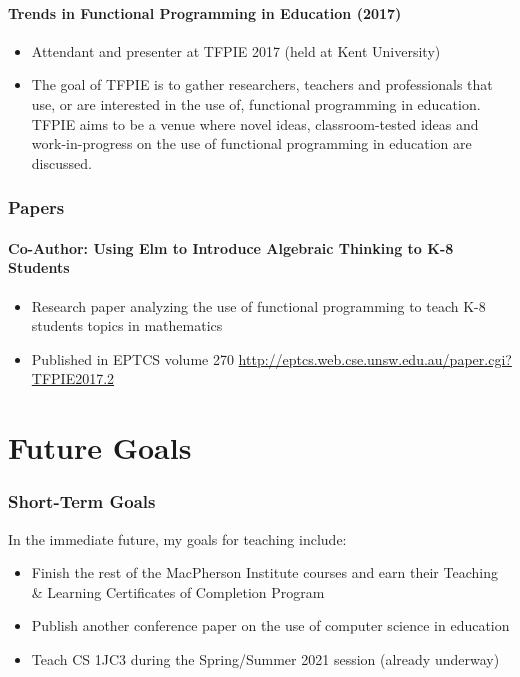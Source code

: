 \documentclass[12pt]{report}
\begin{document}
\subsection{Trends in Functional Programming in Education (2017)}
\label{sec:orgec62704}
\begin{itemize}
\item Attendant and presenter at TFPIE 2017 (held at Kent University)
\item The goal of TFPIE is to gather researchers, teachers and professionals
that use, or are interested in the use of, functional programming in
education. TFPIE aims to be a venue where novel ideas, classroom-tested
ideas and work-in-progress on the use of functional programming in
education are discussed.
\end{itemize}

\section{Papers}
\label{sec:org1e632c1}
\subsection{Co-Author: Using Elm to Introduce Algebraic Thinking to K-8 Students}
\label{sec:org4a5f0c2}
\begin{itemize}
\item Research paper analyzing the use of functional programming to teach K-8
students topics in mathematics
\item Published in EPTCS volume 270 \url{http://eptcs.web.cse.unsw.edu.au/paper.cgi?TFPIE2017.2}
\end{itemize}

\part{Future Goals}
\label{sec:orgf3057ca}
\section{Short-Term Goals}
\label{sec:orga6f4624}
In the immediate future, my goals for teaching include:
\begin{itemize}
\item Finish the rest of the MacPherson Institute courses and earn their
Teaching \& Learning Certificates of Completion Program
\item Publish another conference paper on the use of computer science in education
\item Teach CS 1JC3 during the Spring/Summer 2021 session (already underway)
\end{itemize}
\end{document}
